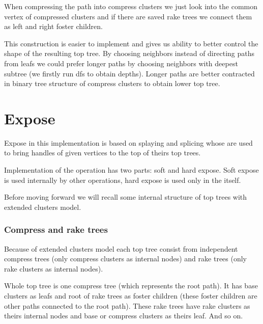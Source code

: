 When compressing the path into compress clusters we just look into the common
vertex of compressed clusters and if there are saved rake trees we connect them
as left and right foster children.

This construction is easier to implement and gives us ability to better control
the shape of the resulting top tree. By choosing neighbors instead of directing
paths from leafs we could prefer longer paths by choosing neighbors with deepest
subtree (we firstly run \gls{dfs} to obtain depths). Longer paths are better
contracted in binary tree structure of compress clusters to obtain lower top
tree.

\section{Expose}

Expose in this implementation is based on splaying and splicing whose are used
to bring handles of given vertices to the top of theirs top trees.

Implementation of the \Expose{} operation has two parts: soft and hard expose. Soft
expose is used internally by other operations, hard expose is used only in the
\Expose{} itself.

Before moving forward we will recall some internal structure of top trees with
extended clusters model.


\subsubsection{Compress and rake trees}

Because of extended clusters model each top tree consist from independent
{\I compress trees} (only compress clusters as internal nodes) and
{\I rake trees} (only rake clusters as internal nodes).

Whole top tree is one compress tree (which represents the {\I root path}). It
has base clusters as leafs and root of rake trees as foster children (these
foster children are other paths connected to the root path). These rake trees
have rake clusters as theirs internal nodes and base or compress clusters as
theirs leaf. And so on.

